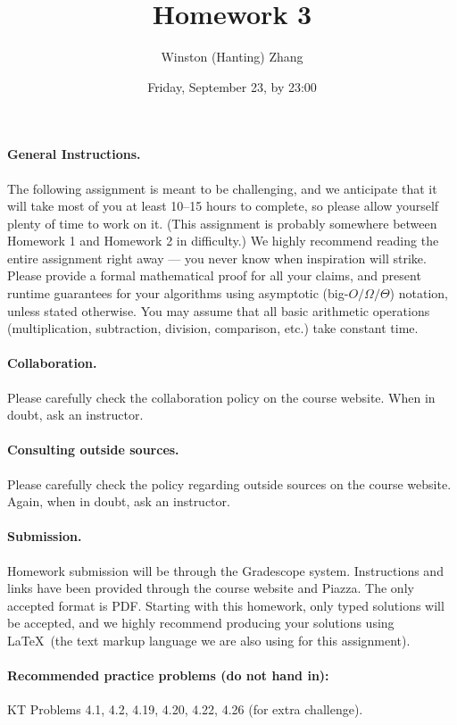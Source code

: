 \documentclass[10pt]{article}
\title{\bf Homework 3}
\author{Winston (Hanting) Zhang}
\date{Friday, September 23, by 23:00}
\begin{document}
\maketitle

\paragraph{General Instructions.} The following assignment is meant to be challenging, and we anticipate that it will take most of you at least 10--15 hours to complete, so please allow yourself plenty of time to work on it. (This assignment is probably somewhere between Homework 1 and Homework 2 in difficulty.)
We highly recommend reading the entire assignment right away --- you never know when inspiration will strike.
Please provide a formal mathematical proof for all your claims, and  present runtime guarantees for your algorithms using asymptotic (big-$O/\Omega/\Theta$) notation, unless stated otherwise. You may assume that all basic arithmetic operations (multiplication, subtraction, division, comparison, etc.) take constant time. %

\paragraph{Collaboration.}  Please carefully check the collaboration policy on the course website. When in doubt, ask an instructor.

\paragraph{Consulting outside sources.} Please carefully check the policy regarding outside sources on the course website. Again, when in doubt, ask an instructor.

\paragraph{Submission.} Homework submission will be through the Gradescope system. Instructions and links have been provided through the course website and Piazza. The only accepted format is PDF. Starting with this homework, only typed solutions will be accepted, and we highly recommend producing your solutions using \LaTeX~(the text markup language we are also using for this assignment).

\paragraph{Recommended practice problems (do not hand in):} KT Problems 4.1, 4.2, 4.19, 4.20, 4.22, 4.26 (for extra challenge).
\end{document}
